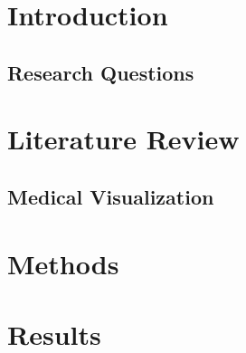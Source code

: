 \documentclass[acmlarge,screen]{acmart}
\begin{document}
%

%

%
\maketitle

\section{Introduction}

\subsection{Research Questions}

\section{Literature Review}

\subsection{Medical Visualization}

\section{Methods}

\section{Results}
\end{document}
